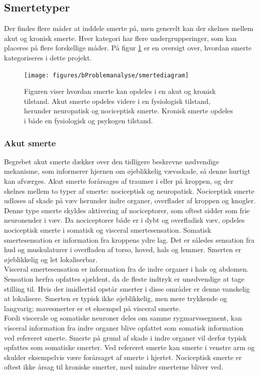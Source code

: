 \subsection{Smertetyper}
Der findes flere måder at inddele smerte på, men generelt kan der skelnes mellem akut og kronisk smerte. Hver kategori har flere undergrupperinger, som kan placeres på flere forskellige måder. \citep{Giangregorio1997} På figur \ref{smertediagram} er en oversigt over, hvordan smerte kategoriseres i dette projekt.

\begin{figure}[H]
\begin{center}
	\texttt{[image: figures/bProblemanalyse/smertediagram]}
	\caption{Figuren viser hvordan smerte kan opdeles i en akut og kronisk tilstand. Akut smerte opdeles videre i en fysiologisk tilstand, herunder neuropatisk og nociceptisk smerte. Kronisk smerte opdeles i både en fysiologisk og psykogen tilstand. \citep{Giangregorio1997}}
	\label{smertediagram}
\end{center}
\end{figure}\vspace{-.25cm}

\subsubsection{Akut smerte}
Begrebet akut smerte dækker over den tidligere beskrevne nødvendige mekanisme, som informerer hjernen om øjeblikkelig vævsskade, så denne hurtigt kan afværges. Akut smerte forårsages af traumer i eller på kroppen, og der skelnes mellem to typer af smerte: nociceptisk og neuropatisk. Nociceptisk smerte udløses af skade på væv herunder indre organer, overflader af kroppen og knogler. Denne type smerte skyldes aktivering af nociceptorer, som oftest sidder som frie neuronender i væv. Da nociceptorer både er i dybt og overfladisk væv, opdeles nociceptisk smerte i somatisk og visceral smertesensation. Somatisk smertesensation er information fra kroppens ydre lag. Det er således sensation fra hud og muskulaturer i overfladen af torso, hoved, hals og lemmer. Smerten er øjeblikkelig og let lokaliserbar. \citep{Martini2012} \\
Visceral smertesensation er information fra de indre organer i hals og abdomen. Sensation herfra opfattes sjældent, da de fleste indtryk er unødvendige at tage stilling til. Hvis der imidlertid opstår smerter i disse områder er denne vanskelig at lokalisere. Smerten er typisk ikke øjeblikkelig, men mere trykkende og langvarig; mavesmerter er et eksempel på visceral smerte. \citep{Martini2012} \\
Fordi viscerale og somatiske neuroner deles om samme rygmarvssegment, kan visceral information fra indre organer blive opfattet som somatisk information ved refereret smerte. Smerte på grund af skade i indre organer vil derfor typisk opfattes som somatiske smerter. Ved refereret smerte kan smerte i venstre arm og skulder eksempelvis være forårsaget af smerte i hjertet. Nociceptisk smerte er oftest ikke årsag til kroniske smerter, med mindre smerterne bliver ved. \citep{Martini2012}

